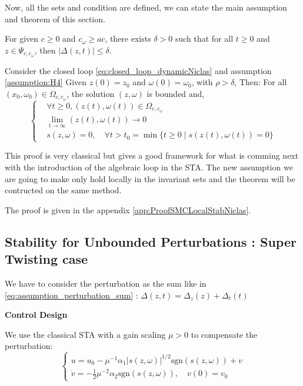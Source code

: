 Now, all the sets and condition are defined, we can state the main assumption and theorem of this section.

\begin{assumption}
    \label{assumption:H4}
    For given \( c \geq 0 \) and \( c_\omega \geq a c \), there exists \(\delta > 0\) such that 
    for all \(t \geq 0 \) and \( z \in \Psi_{c, c_\omega} \), then \( |\Delta(z, t)| \leq \delta \).
\end{assumption}


\begin{theorem}
    Consider the closed loop \ref{eq:closed_loop_dynamicNiclas} and assumption \ref{assumption:H4} 
    Given \( z(0) = z_0 \) and \( \omega(0) = \omega_0 \), with \( \rho > \delta \),
    Then:
    For all \((x_0, \omega_0) \in \Omega_{c, c_\omega}\), the solution \((z, \omega)\) is bounded and,
    \begin{equation}
        \begin{cases}
            &\forall t \geq 0, (z(t), \omega(t)) \in \Omega_{c, c_\omega} \\
            &\lim_{t \to \infty} (z(t), \omega(t)) \to 0 \\
            &s(z, \omega) = 0, \quad \forall t > t_0 = \min \{ t \geq 0 \mid s(z(t), \omega(t)) = 0 \}
        \end{cases}
    \end{equation}
\end{theorem}

This proof is very classical but gives a good framework for what is comming next with the introduction of the 
algebraic loop in the STA. The new assumption we are going to make only hold locally in the invariant sets 
and the theorem will be contructed on the same method.

The proof is given in the appendix \ref{app:ProofSMCLocalStabNiclas}.

\subsection{Stability for Unbounded Perturbations : Super Twisting case}

We have to consider the perturbation as the sum like in \ref{eq:assumption_perturbation_sum} 
: \( \Delta(z, t) = \Delta_z(z) + \Delta_t(t) \)

\textbf{Control Design} 

We use the classical STA with a gain scaling \(\mu > 0\) to compensate the perturbation:
\begin{equation}
    \begin{cases}
        u = u_0 - \mu^{-1} \alpha_1 |s(z, \omega)|^{1/2} \text{sgn}(s(z, \omega)) + v \\
        \dot{v} = -\frac{1}{2} \mu^{-2} \alpha_2 \text{sgn}(s(z, \omega)), \quad v(0) = v_0
    \end{cases}
\end{equation}

